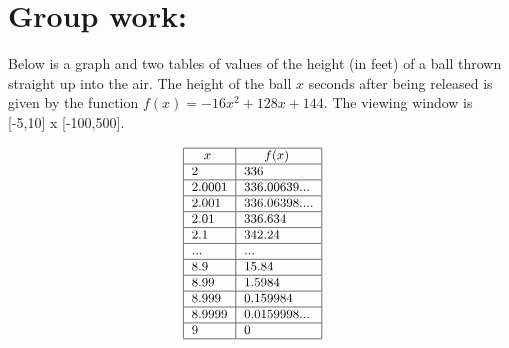 \documentclass[nooutcomes]{ximera}
\begin{document}
\section*{Group work:}
\begin{problem}
Below is a graph and two tables of values of the height (in feet) of a ball thrown straight up into the air.   The height of the ball $x$ seconds after being released is given by the function $f(x)=-16x^2+128x+144$.  The viewing window is [-5,10] x [-100,500].
	
	
	
	
\[ \begin{array}{lr}

\small{	
\begin{tabular}{|l|l|}
\hline
\hspace{2mm} $x$ & \hspace{4mm} $f(x)$  \\
\hline
2 & 336  \\
\hline
2.0001 & 336.00639...  \\
\hline
2.001 & 336.06398....  \\
\hline
2.01 & 336.634  \\
\hline
2.1 & 342.24  \\
\hline
... & ...  \\
\hline
8.9 & 15.84  \\
\hline
8.99 & 1.5984  \\
\hline
8.999 & 0.159984  \\
\hline
8.9999 & 0.0159998...  \\
\hline
9 & 0 \\
\hline
\end{tabular}
}

&  


\end{array}\]
\end{problem}
\end{document}
